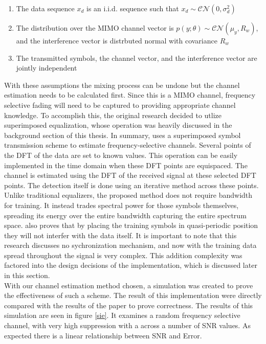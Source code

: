 \begin{enumerate}
\item The data sequence \(x_{d}\) is an i.i.d. sequence such that \(x_{d}\sim\mathcal{CN}(0,\sigma_{d}^{2})\)

\item The distribution over the MIMO channel vector is \(p(y;\theta)\sim\mathcal{CN}(\mu_{y},R_{w})\), and the interference vector is distrbuted normal with covariance \(R_{w}\)

\item The transmitted symbols, the channel vector, and the interference vector are jointly independent
\end{enumerate}

With these assumptions the mixing process can be undone but the channel estimation needs to be calculated first.  Since this is a MIMO channel, frequency selective fading will need to be captured to providing appropriate channel knowledge.  To accomplish this, the original research decided to utlize superimposed equalization, whose operation was heavily discussed in the background section of this thesis.  In summary, \cite{Ghogho} uses a superimposed symbol transmission scheme to estimate frequency-selective channels. Several points of the DFT of the data are set to known values. This operation can be easily implemented in the time domain when these DFT points are equispaced. The channel is estimated using the DFT of the received signal at these selected DFT points. The detection itself is done using an iterative method across these points.  Unlike traditional equalizers, the proposed method does not require bandwidth for training.  It instead trades spectral power for those symbols themselves, spreading its energy over the entire bandwidth capturing the entire spectrum space.   \cite{Ghogho} also proves that by placing the training symbols in quasi-periodic position they will not interfer with the data itself.  It is important to note that this research discusses no sychronization mechanism, and now with the training data spread throughout the signal is very complex.  This addition complexity was factored into the design decisions of the implementation, which is discussed later in this section.\\

With our channel estimation method chosen, a simulation was created to prove the effectiveness of such a scheme.  The result of this implementation were directly compared with the results of the paper to prove correctness.%
The results of this simulation are seen in figure \ref{sie}.  It examines a random frequency selective channel, with very high suppression with a across a number of SNR values.  As expected there is a linear relationship between SNR and Error.\\  %

